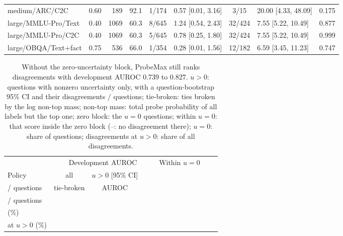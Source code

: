 \begin{table}[!htbp]
\begin{tabular*}{\linewidth}{@{}l@{\hspace{5pt}\extracolsep{\fill}}lrcclcll@{}}
medium/ARC/C2C & 0.60 & 189 & 92.1 & 1/174 & 0.57 [0.01, 3.16] & 3/15 & 20.00 [4.33, 48.09] & 0.175\\
large/MMLU-Pro/Text & 0.40 & 1069 & 60.3 & 8/645 & 1.24 [0.54, 2.43] & 32/424 & 7.55 [5.22, 10.49] & 0.877\\
large/MMLU-Pro/C2C & 0.40 & 1069 & 60.3 & 5/645 & 0.78 [0.25, 1.80] & 32/424 & 7.55 [5.22, 10.49] & 0.999\\
large/OBQA/Text+fact & 0.75 & 536 & 66.0 & 1/354 & 0.28 [0.01, 1.56] & 12/182 & 6.59 [3.45, 11.23] & 0.747\\\bottomrule
\end{tabular*}
\end{table}

\begin{table}[!htbp]\centering\scriptsize
\caption{Without the zero-uncertainty block, ProbeMax still ranks disagreements with development AUROC 0.739 to 0.827. $u>0$: questions with nonzero uncertainty only, with a question-bootstrap 95\% CI and their disagreements / questions; tie-broken: ties broken by the log non-top mass; non-top mass: total probe probability of all labels but the top one; zero block: the $u=0$ questions; within $u=0$: that score inside the zero block (--: no disagreement there); $u=0$: share of questions; disagreements at $u>0$: share of all disagreements.}
\label{tab:auroc_u0}
\renewcommand{\arraystretch}{1.1}\setlength{\tabcolsep}{2.5pt}
\begin{tabular*}{\linewidth}{@{}l@{\hspace{5pt}\extracolsep{\fill}}cccccccc@{}}\toprule
& \multicolumn{4}{c}{Development AUROC} & \multicolumn{2}{c}{Within $u=0$} & & \\\cmidrule(lr){2-5}\cmidrule(lr){6-7}
Policy & all & $u>0$ [95\% CI] & \begin{tabular}[b]{@{}c@{}}disagreements\\/ questions\end{tabular} & tie-broken & AUROC & \begin{tabular}[b]{@{}c@{}}disagreements\\/ questions\end{tabular} & \begin{tabular}[b]{@{}c@{}}$u=0$\\(\%)\end{tabular} & \begin{tabular}[b]{@{}c@{}}Disagreements\\at $u>0$ (\%)\end{tabular}\\\midrule

\end{tabular*}
\end{table}
